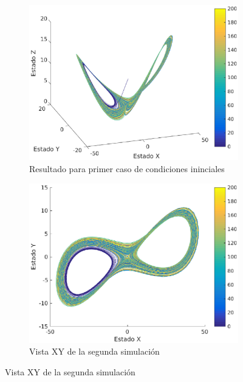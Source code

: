 \documentclass[12pt,letterpaper]{article}
\begin{document}
\begin{figure}
	\centering
	\begin{subfigure}[b]{0.36\textwidth}
		\includegraphics[width=\textwidth]{pictures/segunda_simulacion}
		\caption{Resultado para primer caso de condiciones ininciales}
		\label{fig:simulacion2}
	\end{subfigure}
	\begin{subfigure}[b]{0.36\textwidth}
		\includegraphics[width=\textwidth]{pictures/segunda_simulacion_xy}
		\caption{Vista XY de la segunda simulación}
		\label{fig:simulacion2xy}

\end{subfigure}
\end{figure}
\end{document}
